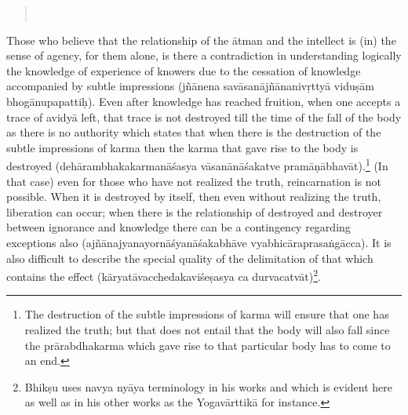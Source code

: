 \begin{verse}
\\
\end{verse}

Those who believe that the relationship of the ātman and the intellect is (in) the sense of agency, for them alone, is there a contradiction in understanding logically the knowledge of experience of knowers due to the cessation of knowledge accompanied by subtle impressions (jñānena savāsanājñānanivṛttyā viduṣām bhogānupapattiḥ). Even after knowledge has reached fruition, when one accepts a trace of avidyā left, that trace is not destroyed till the time of the fall of the body as there is no authority which states that when there is the destruction of the subtle impressions of karma then the karma that gave rise to the body is destroyed (dehārambhakakarmanāśasya vāsanānāśakatve pramāṇābhavāt).\footnote{The destruction of the subtle impressions of karma will ensure that one has realized the truth; but that does not entail that the body will also fall since the prārabdhakarma which gave rise to that particular body has to come to an end.} (In that case) even for those who have not realized the truth, reincarnation is not possible. When it is destroyed by itself, then even without realizing the truth, liberation can occur; when there is the relationship of destroyed and destroyer between ignorance and knowledge there can be a contingency regarding exceptions also (ajñānajyanayornāśyanāśakabhāve vyabhicāraprasaṅgācca). It is also difficult to describe the special quality of the delimitation of that which contains the effect (kāryatāvacchedakaviśeṣasya ca durvacat\-vāt)\footnote{Bhikṣu uses navya nyāya terminology in his works and which is evident here as well as in his other works as the Yogavārttikā for instance.}. 

